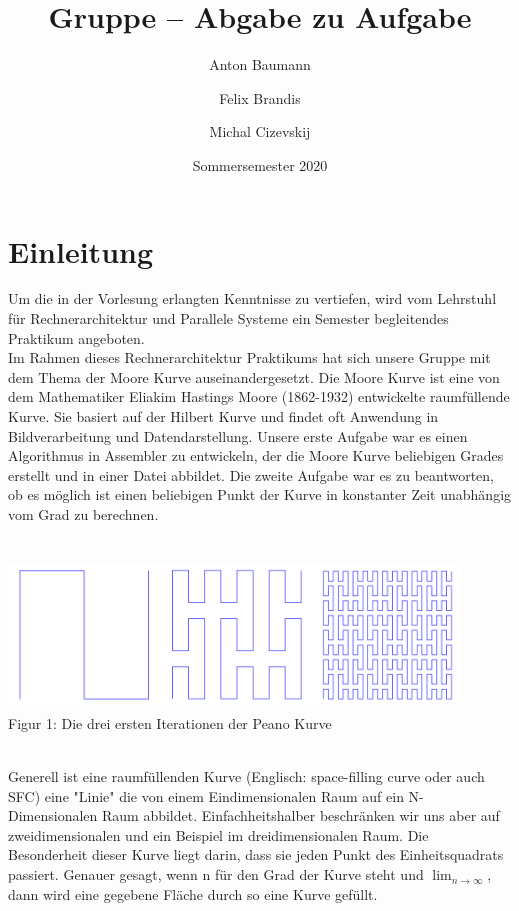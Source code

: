 \documentclass[course=erap]{aspdoc}
\author{Anton Baumann \and Felix Brandis \and Michal Cizevskij}
\date{Sommersemester 2020} %
\title{Gruppe \theGroup{} -- Abgabe zu Aufgabe \theNumber}
\begin{document}
\maketitle

\section{Einleitung}

Um die in der Vorlesung erlangten Kenntnisse zu vertiefen, wird vom Lehrstuhl für Rechnerarchitektur und Parallele Systeme ein Semester begleitendes Praktikum angeboten.\\
Im Rahmen dieses Rechnerarchitektur Praktikums hat sich unsere Gruppe mit dem Thema der Moore Kurve auseinandergesetzt. Die Moore Kurve ist eine von dem Mathematiker Eliakim Hastings Moore (1862-1932) entwickelte raumfüllende Kurve. Sie basiert auf der Hilbert Kurve und findet oft Anwendung in Bildverarbeitung und Datendarstellung. Unsere erste Aufgabe war es einen Algorithmus in Assembler zu entwickeln, der die Moore Kurve beliebigen Grades erstellt und in einer Datei abbildet. Die zweite Aufgabe war es zu beantworten, ob es möglich ist einen beliebigen Punkt der Kurve in konstanter Zeit unabhängig vom Grad zu berechnen.\\
\\
\begin{center}
	\includegraphics[width=12cm, height=4cm]{Peano}\\ %
	\tiny Figur 1: Die drei ersten Iterationen der Peano Kurve
\end{center}
\	\\
Generell ist eine raumfüllenden Kurve (Englisch: space-filling curve oder auch SFC) eine "Linie" die von einem Eindimensionalen Raum auf ein N-Dimensionalen Raum abbildet. Einfachheitshalber beschränken wir uns aber auf zweidimensionalen und ein Beispiel im dreidimensionalen Raum. Die Besonderheit dieser Kurve liegt darin, dass sie jeden Punkt des Einheitsquadrats passiert. Genauer gesagt, wenn n für den Grad der Kurve steht und $\lim_{n\to\infty}$, dann wird eine gegebene Fläche durch so eine Kurve gefüllt.\\
\end{document}
